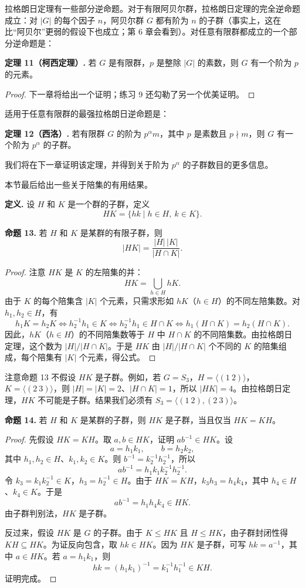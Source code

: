 拉格朗日定理有一些部分逆命题。对于有限阿贝尔群，拉格朗日定理的完全逆命题成立：对 $|G|$ 的每个因子 $n$，阿贝尔群 $G$ 都有阶为 $n$ 的子群（事实上，这在比“阿贝尔”更弱的假设下也成立；第 6 章会看到）。对任意有限群都成立的一个部分逆命题是：

\medskip
\noindent\textbf{定理 11（柯西定理）.} 若 $G$ 是有限群，$p$ 是整除 $|G|$ 的素数，则 $G$ 有一个阶为 $p$ 的元素。

\begin{proof}
下一章将给出一个证明；练习 9 还勾勒了另一个优美证明。
\end{proof}

适用于任意有限群的最强拉格朗日逆命题是：

\medskip
\noindent\textbf{定理 12（西洛）.} 若有限群 $G$ 的阶为 $p^\alpha m$，其中 $p$ 是素数且 $p\nmid m$，则 $G$ 有一个阶为 $p^\alpha$ 的子群。

我们将在下一章证明该定理，并得到关于阶为 $p^\alpha$ 的子群数目的更多信息。

本节最后给出一些关于陪集的有用结果。

\noindent\textbf{定义.} 设 $H$ 和 $K$ 是一个群的子群，定义
\[
  HK=\{hk\mid h\in H,
  \ k\in K\}.
\]

\medskip
\noindent\textbf{命题 13.} 若 $H$ 和 $K$ 是某群的有限子群，则
\[
  |HK|=\frac{|H|\,|K|}{|H\cap K|}.
\]

\begin{proof}
注意 $HK$ 是 $K$ 的左陪集的并：
\[
  HK=\bigcup_{h\in H}hK.
\]
由于 $K$ 的每个陪集含 $|K|$ 个元素，只需求形如 $hK$（$h\in H$）的不同左陪集数。对 $h_1,h_2\in H$，有
\[
  h_1K=h_2K
  \Longleftrightarrow h_2^{-1}h_1\in K
  \Longleftrightarrow h_2^{-1}h_1\in H\cap K
  \Longleftrightarrow h_1(H\cap K)=h_2(H\cap K).
\]
因此，$hK$（$h\in H$）的不同陪集数等于 $H$ 中 $H\cap K$ 的不同陪集数。由拉格朗日定理，这个数为 $|H|/|H\cap K|$。于是 $HK$ 由 $|H|/|H\cap K|$ 个不同的 $K$ 的陪集组成，每个陪集有 $|K|$ 个元素，得公式。
\end{proof}

注意命题 13 不假设 $HK$ 是子群。例如，若 $G=S_3$，$H=\langle(1\ 2)\rangle$，$K=\langle(2\ 3)\rangle$，则 $|H|=|K|=2$、$|H\cap K|=1$，所以 $|HK|=4$。由拉格朗日定理，$HK$ 不可能是子群。结果我们必须有 $S_3=\langle(1\ 2),(2\ 3)\rangle$。

\medskip
\noindent\textbf{命题 14.} 若 $H$ 和 $K$ 是某群的子群，则 $HK$ 是子群，当且仅当 $HK=KH$。

\begin{proof}
先假设 $HK=KH$。取 $a,b\in HK$，证明 $ab^{-1}\in HK$。设
\[
  a=h_1k_1,
  \qquad b=h_2k_2,
\]
其中 $h_1,h_2\in H$、$k_1,k_2\in K$。则 $b^{-1}=k_2^{-1}h_2^{-1}$，所以
\[
  ab^{-1}=h_1k_1k_2^{-1}h_2^{-1}.
\]
令 $k_3=k_1k_2^{-1}\in K$，$h_3=h_2^{-1}\in H$。由于 $HK=KH$，$k_3h_3=h_4k_4$，其中 $h_4\in H$、$k_4\in K$。于是
\[
  ab^{-1}=h_1h_4k_4\in HK.
\]
由子群判别法，$HK$ 是子群。

反过来，假设 $HK$ 是 $G$ 的子群。由于 $K\leq HK$ 且 $H\leq HK$，由子群封闭性得 $KH\subseteq HK$。为证反向包含，取 $hk\in HK$。因为 $HK$ 是子群，可写 $hk=a^{-1}$，其中 $a\in HK$。若 $a=h_1k_1$，则
\[
  hk=(h_1k_1)^{-1}=k_1^{-1}h_1^{-1}\in KH.
\]
证明完成。
\end{proof}

